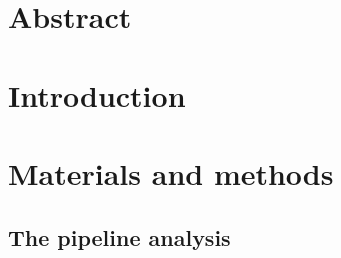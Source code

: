 \documentclass[10pt,letterpaper]{article}
\date{}
\begin{document}
\section{Abstract}

\section{Introduction}

\section{Materials and methods}

\subsection{The pipeline analysis}
\end{document}
